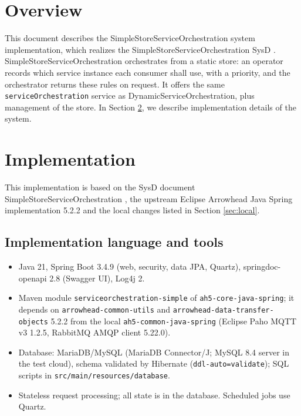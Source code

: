 \documentclass[a4paper]{arrowhead}
\begin{document}
\section{Overview}
\label{sec:overview}

This document describes the SimpleStoreServiceOrchestration system implementation, which realizes the SimpleStoreServiceOrchestration SysD \cite{ssso-sysd}. Simple\allowbreak{}Store\allowbreak{}Service\allowbreak{}Orchestration orchestrates from a static store: an operator records which service instance each consumer shall use, with a priority, and the orchestrator returns these rules on request. It offers the same \texttt{service\allowbreak{}Orchestration} service as Dynamic\allowbreak{}Service\allowbreak{}Orchestration, plus management of the store.
In Section \ref{Implementation}, we describe implementation details of the system.

\newpage

\section{Implementation}
\label{Implementation}

This implementation is based on the SysD document SimpleStoreServiceOrchestration \cite{ssso-sysd}, the upstream Eclipse Arrowhead Java Spring implementation 5.2.2 \cite{ah5java} and the local changes listed in Section \ref{sec:local}.

\subsection{Implementation language and tools}
\begin{itemize}
\item Java 21, Spring Boot 3.4.9 (web, security, data JPA, Quartz), springdoc-openapi 2.8 (Swagger UI), Log4j 2.
\item Maven module \texttt{serviceorchestration-simple} of \texttt{ah5-core-java-spring}; it depends on \texttt{arrowhead-common-utils} and \texttt{arrowhead-data-transfer-objects} 5.2.2 from the local \texttt{ah5-common-java-spring} (Eclipse Paho MQTT v3 1.2.5, RabbitMQ AMQP client 5.22.0).
\item Database: MariaDB/MySQL (MariaDB Connector/J; MySQL 8.4 server in the test cloud), schema validated by Hibernate (\texttt{ddl-auto=validate}); SQL scripts in \texttt{src/main/resources/database}.
\item Stateless request processing; all state is in the database. Scheduled jobs use Quartz.
\end{itemize}
\end{document}
